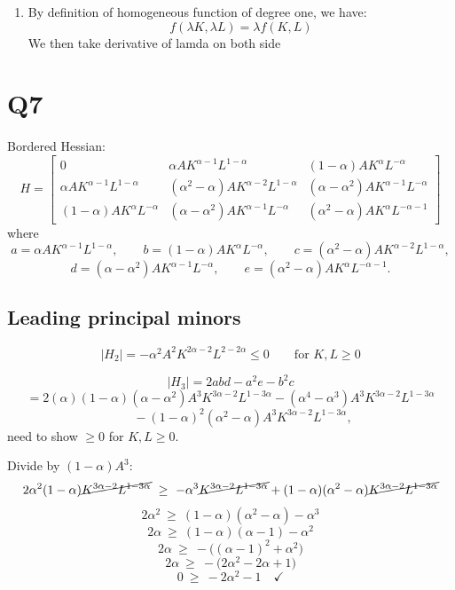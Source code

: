 \documentclass{article}
\begin{document}
\begin{enumerate}[label=(\arabic*)]
    \item By definition of homogeneous function of degree one, we have:
    \[f(\lambda K, \lambda L) = \lambda f(K,L)    
    \]
    We then take derivative of lamda on both side
\end{enumerate}

\section*{Q7}

Bordered Hessian:
\[
H=
\begin{bmatrix}
0 & \alpha AK^{\alpha-1}L^{1-\alpha} & (1-\alpha)AK^{\alpha}L^{-\alpha}\\[4pt]
\alpha AK^{\alpha-1}L^{1-\alpha} & (\alpha^2-\alpha)AK^{\alpha-2}L^{1-\alpha} & (\alpha-\alpha^2)AK^{\alpha-1}L^{-\alpha}\\[4pt]
(1-\alpha)AK^{\alpha}L^{-\alpha} & (\alpha-\alpha^2)AK^{\alpha-1}L^{-\alpha} & (\alpha^2-\alpha)AK^{\alpha}L^{-\alpha-1}
\end{bmatrix}
\]
where
\[
a=\alpha AK^{\alpha-1}L^{1-\alpha},\qquad
b=(1-\alpha)AK^{\alpha}L^{-\alpha},\qquad
c=(\alpha^2-\alpha)AK^{\alpha-2}L^{1-\alpha},
\]
\[
d=(\alpha-\alpha^2)AK^{\alpha-1}L^{-\alpha},\qquad
e=(\alpha^2-\alpha)AK^{\alpha}L^{-\alpha-1}.
\]

\subsection*{Leading principal minors}

\[
|H_2|=-\alpha^2A^2K^{2\alpha-2}L^{2-2\alpha}\le 0
\qquad\text{for }K,L\ge 0
\]

\[
|H_3|=2abd-a^2e-b^2c
\]
\[
=2(\alpha)(1-\alpha)(\alpha-\alpha^2)A^3K^{3\alpha-2}L^{1-3\alpha}
-(\alpha^4-\alpha^3)A^3K^{3\alpha-2}L^{1-3\alpha}
\]
\[
\qquad-(1-\alpha)^2(\alpha^2-\alpha)A^3K^{3\alpha-2}L^{1-3\alpha},
\]
need to show $\ge 0$ for $K,L\ge 0$.

Divide by $(1-\alpha)A^3$:
\[
2\alpha^2(1-\alpha)\cancel{K^{3\alpha-2}L^{1-3\alpha}}
\ \ge\ -\alpha^3\cancel{K^{3\alpha-2}L^{1-3\alpha}}
+(1-\alpha)(\alpha^2-\alpha)\cancel{K^{3\alpha-2}L^{1-3\alpha}}
\]
\[
2\alpha^2\ \ge\ (1-\alpha)(\alpha^2-\alpha)-\alpha^3
\]
\[
2\alpha\ \ge\ (1-\alpha)(\alpha-1)-\alpha^2
\]
\[
2\alpha\ \ge\ -\big((\alpha-1)^2+\alpha^2\big)
\]
\[
2\alpha\ \ge\ -\big(2\alpha^2-2\alpha+1\big)
\]
\[
0\ \ge\ -2\alpha^2-1\quad\checkmark
\]
\end{document}
